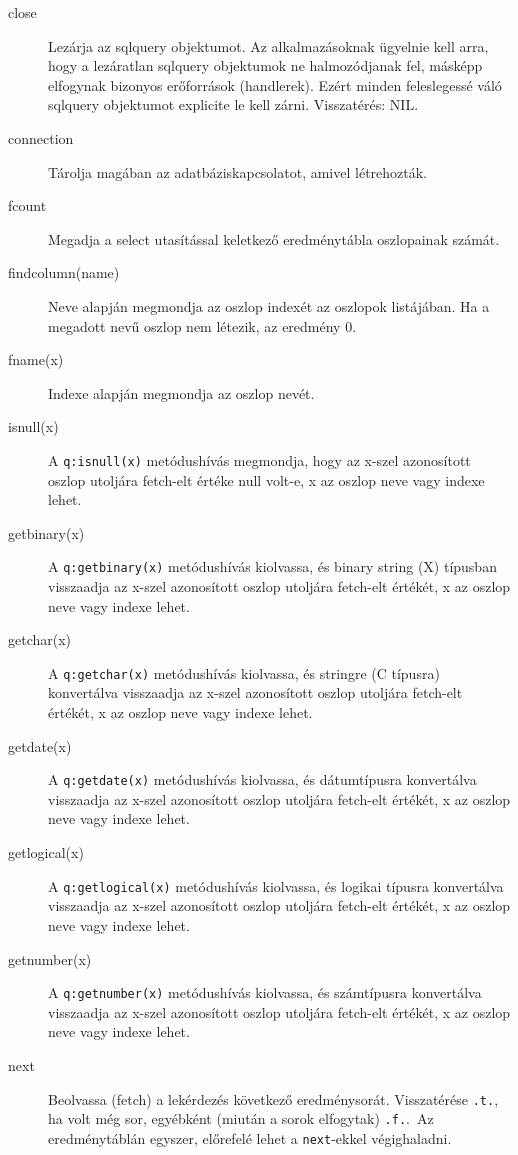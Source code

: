 \begin{description}
\item[close]
    Lezárja az sqlquery objektumot.
    Az alkalmazásoknak ügyelnie kell arra,
    hogy a lezáratlan sqlquery objektumok ne halmozódjanak fel,
    másképp elfogynak bizonyos erőforrások (handlerek).
    Ezért minden feleslegessé váló sqlquery objektumot 
    explicite le kell zárni. Visszatérés: NIL.
\item[connection]
    Tárolja magában az adatbáziskapcsolatot, 
    amivel létrehozták.
\item[fcount]
    Megadja a select utasítással keletkező eredménytábla
    oszlopainak számát.
\item[findcolumn(name)]
    Neve alapján megmondja az oszlop indexét az oszlopok listájában.
    Ha a megadott nevű oszlop nem létezik, az eredmény 0.
\item[fname(x)]
    Indexe alapján megmondja az oszlop nevét.
\item[isnull(x)]
    A \verb!q:isnull(x)! metódushívás megmondja, hogy
    az x-szel azonosított oszlop utoljára fetch-elt értéke
    null volt-e, x az oszlop neve vagy indexe lehet.
\item[getbinary(x)]
    A \verb!q:getbinary(x)! metódushívás kiolvassa, 
    és binary string (X) típusban visszaadja
    az x-szel azonosított oszlop utoljára fetch-elt értékét,
    x az oszlop neve vagy indexe lehet.
\item[getchar(x)]
    A \verb!q:getchar(x)! metódushívás kiolvassa, és
    stringre (C típusra) konvertálva visszaadja
    az x-szel azonosított oszlop utoljára fetch-elt értékét,
    x az oszlop neve vagy indexe lehet.
\item[getdate(x)]
    A \verb!q:getdate(x)! metódushívás kiolvassa, és
    dátumtípusra konvertálva visszaadja 
    az x-szel azonosított oszlop utoljára fetch-elt értékét,
    x az oszlop neve vagy indexe lehet.
\item[getlogical(x)]
    A \verb!q:getlogical(x)! metódushívás kiolvassa, és
    logikai típusra konvertálva visszaadja
    az x-szel azonosított oszlop utoljára fetch-elt értékét,
    x az oszlop neve vagy indexe lehet.
\item[getnumber(x)]
    A \verb!q:getnumber(x)! metódushívás kiolvassa, és
    számtípusra konvertálva visszaadja 
    az x-szel azonosított oszlop utoljára fetch-elt értékét,
    x az oszlop neve vagy indexe lehet.
\item[next]
    Beolvassa (fetch) a lekérdezés következő eredménysorát.
    Visszatérése \verb!.t.!, ha volt még sor, egyébként (miután a 
    sorok elfogytak) \verb!.f.!.\  Az eredménytáblán
    egyszer, előrefelé lehet a \verb!next!-ekkel  végighaladni.
\end{description}


